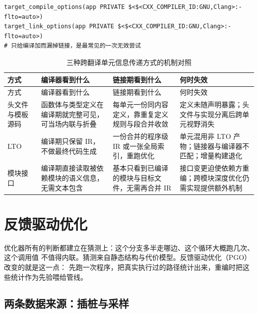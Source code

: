 \documentclass[12pt,a4paper,fontset=fandol]{ctexbook}
\newcommand{\Mx}[1]{\textsf{#1}}
\begin{document}
\begin{lstlisting}[style=cmakestyle, caption={构建配置里同时给编译与链接开 LTO}]
target_compile_options(app PRIVATE $<$<CXX_COMPILER_ID:GNU,Clang>:-flto=auto>)
target_link_options(app PRIVATE $<$<CXX_COMPILER_ID:GNU,Clang>:-flto=auto>)
# 只给编译加而漏掉链接，是最常见的一次无效尝试
\end{lstlisting}

\begin{longtable}{@{}>{\raggedright\arraybackslash}p{} >{\raggedright\arraybackslash}p{} >{\raggedright\arraybackslash}p{} >{\raggedright\arraybackslash}p{}@{}}
\caption{三种跨翻译单元信息传递方式的机制对照}\label{tab:cl05-crossTU}\\
\toprule
方式 & 编译器看到什么 & 链接期看到什么 & 何时失效 \\
\midrule
\endfirsthead
\toprule
方式 & 编译器看到什么 & 链接期看到什么 & 何时失效 \\
\midrule
\endhead
\bottomrule
\endfoot
头文件与模板源码 &
  函数体与类型定义在编译期就完整可见，可当场内联与折叠 &
  每单元一份同内容定义，靠重复定义规则与段合并收敛 &
  定义未随声明暴露；头文件与实现分离后跨单元视野消失 \\
\Mx{LTO} &
  编译期只保留 \Mx{IR}，不做最终代码生成 &
  一份合并的程序级 \Mx{IR} 或一张全局索引，重跑优化 &
  单元混用非 \Mx{LTO} 产物；链接器与编译器不匹配；增量构建退化 \\
模块接口 &
  编译期直接读取被依赖模块的语义信息，无需文本包含 &
  基本只看到已编译的模块与目标文件，无需再合并 \Mx{IR} &
  接口变更迫使依赖方重编；跨模块深度优化仍需实现提供额外机制 \\
\end{longtable}

\section{反馈驱动优化}\label{sec:cl05-pgo}

优化器所有的判断都建立在猜测上：这个分支多半走哪边、这个循环大概跑几次、这个调用值
不值得内联。猜测来自静态结构与代价模型。反馈驱动优化（\Mx{PGO}）改变的就是这一点：
先跑一次程序，把真实执行过的路径统计出来，重编时把这些统计作为先验喂给管线。

\subsection{两条数据来源：插桩与采样}\label{sec:cl05-pgosource}
\end{document}
